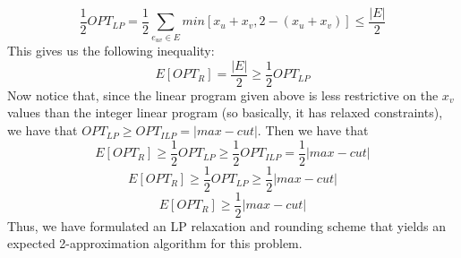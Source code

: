 \documentclass{article}
\begin{document}
\[ \frac{1}{2} OPT_{LP} = \frac{1}{2} \sum_{e_{uv} \in E} min[x_u + x_v, 2 -
(x_u + x_v)] \leq \frac{|E|}{2} \]
This gives us the following inequality:
\[ E[OPT_R] = \frac{|E|}{2} \geq \frac{1}{2} OPT_{LP} \]
Now notice that, since the linear program given above is less restrictive on the
$x_v$ values than the integer linear program (so basically, it has relaxed
constraints), we have that $OPT_{LP} \geq OPT_{ILP} = |max-cut|$. Then we have
that
\[ E[OPT_R] \geq \frac{1}{2} OPT_{LP} \geq \frac{1}{2} OPT_{ILP} = \frac{1}{2} |max-cut| \]
\[ E[OPT_R] \geq \frac{1}{2} OPT_{LP} \geq \frac{1}{2} |max-cut| \]
\[ E[OPT_R] \geq \frac{1}{2} |max-cut| \]
Thus, we have formulated an LP relaxation and rounding scheme that yields an
expected 2-approximation algorithm for this problem.
\newpage

\end{document}
